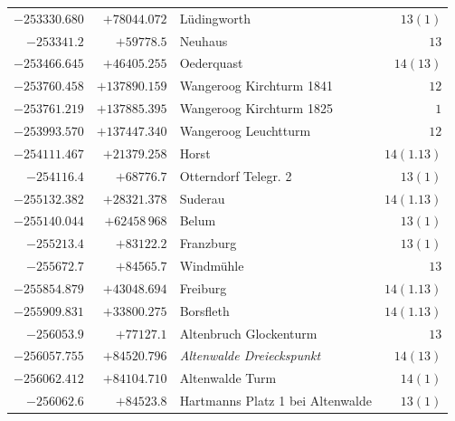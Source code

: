 \begin{center}
\begin{tabular}{r|r|p{170pt}|r}
\(-253330.680\)&\(+78044.072\)&Lüdingworth&\(13(1)\)\\
\(-253341.2\)&\(+59778.5\)&Neuhaus&\(13\)\\
\(-253466.645\)&\(+46405.255\)&Oederquast&\(14(13)\)\\
\(-253760.458\)&\(+137890.159\)&Wangeroog Kirchturm 1841&\(12\)\\
\(-253761.219\)&\(+137885.395\)&Wangeroog Kirchturm 1825&\(1\)\\
\(-253993.570\)&\(+137447.340\)&Wangeroog Leuchtturm&\(12\)\\
\(-254111.467\)&\(+21379.258\)&Horst&\(14(1.13)\)\\
\(-254116.4\)&\(+68776.7\)&Otterndorf Telegr. 2&\(13(1)\)\\
\(-255132.382\)&\(+28321.378\)&Suderau&\(14(1.13)\)\\
\(-255140.044\)&\(+62458\,968\)&Belum&\(13(1)\)\\
\(-255213.4\)&\(+83122.2\)&Franzburg&\(13(1)\)\\
\(-255672.7\)&\(+84565.7\)&Windmühle&\(13\)\\
\(-255854.879\)&\(+43048.694\)&Freiburg&\(14(1.13)\)\\
\(-255909.831\)&\(+33800.275\)&Borsfleth&\(14(1.13)\)\\
\(-256053.9\)&\(+77127.1\)&Altenbruch Glockenturm&\(13\)\\
\(-256057.755\)&\(+84520.796\)&\textit{Altenwalde Dreieckspunkt}&\(14(13)\)\\
\(-256062.412\)&\(+84104.710\)&Altenwalde Turm&\(14(1)\)\\
\(-256062.6\)&\(+84523.8\)&Hartmanns Platz 1 bei Altenwalde&\(13(1)\)\\
\hline\end{tabular}\endgroup\end{center}
